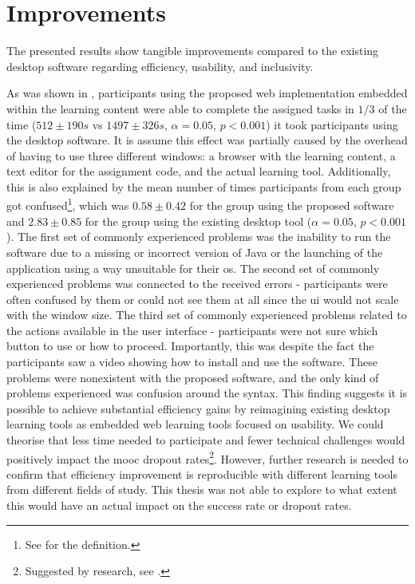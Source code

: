 {\section{Improvements}

The presented results show tangible improvements compared to the existing desktop software regarding efficiency, usability, and inclusivity.

As was shown in , participants using the proposed web implementation embedded within the learning content were able to complete the assigned tasks in $1/3$ of the time ($512 \pm190 s$ vs $1497 \pm326 s$, $\alpha=0.05$, $p<0.001$) it took participants using the desktop software.
It is assume this effect was partially caused by the overhead of having to use three different windows: a browser with the learning content, a text editor for the assignment code, and the actual learning tool.
Additionally, this is also explained by the mean number of times participants from each group got confused\footnote{See  for the definition.}, which was $0.58 \pm 0.42$ for the group using the proposed software and $2.83 \pm 0.85$ for the group using the existing desktop tool ($\alpha=0.05$, $p<0.001$).
The first set of commonly experienced problems was the inability to run the software due to a missing or incorrect version of Java or the launching of the application using a way unsuitable for their \gls{os}.
The second set of commonly experienced problems was connected to the received errors - participants were often confused by them or could not see them at all since the \gls{ui} would not scale with the window size.
The third set of commonly experienced problems related to the actions available in the user interface - participants were not sure which button to use or how to proceed.
Importantly, this was despite the fact the participants saw a video showing how to install and use the software.
These problems were nonexistent with the proposed software, and the only kind of problems experienced was confusion around the syntax.
This finding suggests it is possible to achieve substantial efficiency gains by reimagining existing desktop learning tools as embedded web learning tools focused on usability.
We could theorise that less time needed to participate and fewer technical challenges would positively impact the \gls{mooc} dropout rates\footnote{Suggested by research, see .}.
However, further research is needed to confirm that efficiency improvement is reproducible with different learning tools from different fields of study.
This thesis was not able to explore to what extent this would have an actual impact on the success rate or dropout rates.

}
